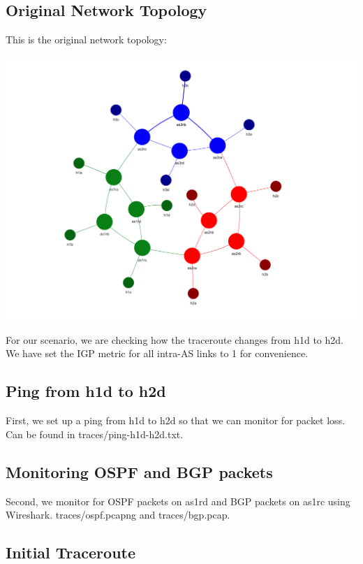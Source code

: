 \subsection{Original Network Topology}

This is the original network topology:

\begin{center}
\includegraphics[scale=0.6]{Lab4/graphics/ex5graph.png}
\end{center}

For our scenario, we are checking how the traceroute changes from h1d to h2d. We have set the IGP metric for all intra-AS links to 1 for convenience.

\subsection{Ping from h1d to h2d}

First, we set up a ping from h1d to h2d so that we can monitor for packet loss. Can be found in traces/ping-h1d-h2d.txt.

\subsection{Monitoring OSPF and BGP packets}

Second, we monitor for OSPF packets on as1rd and BGP packets on as1rc using Wireshark. traces/ospf.pcapng and traces/bgp.pcap.

\subsection{Initial Traceroute}

